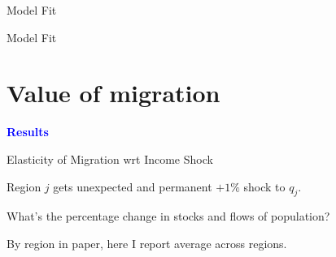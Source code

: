 \documentclass[12pt,english, aspectratio=169]{beamer}
\begin{document}
\begin{frame}{Model Fit}

\hspace*{-2pt}

\end{frame}

\begin{frame}{Model Fit }

\hspace*{-2pt}
\end{frame}


\section{Value of migration }



\begin{frame}[plain]{}

\vspace{1cm}

\begin{center}
\textbf{\textcolor{blue}{\LARGE{}Results}}{\LARGE\par}
\par\end{center}

\end{frame}


\begin{frame}{Elasticity of Migration wrt Income Shock}

\begin{midi}
\item Region $j$ gets unexpected and permanent $+1\%$ shock to $q_j$.
\item What's the percentage change in stocks and flows of population?
\item By region in paper, here I report average across regions.
\end{midi}
\pause
\vspace{0.5cm}

\begin{adjustbox}{center}

\end{adjustbox}
\end{frame}
\end{document}
